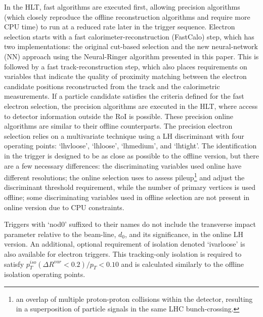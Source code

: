 In the HLT, fast algorithms are executed first, allowing precision algorithms (which closely reproduce the offline reconstruction algorithms and require more CPU time) to run at a reduced rate later in the trigger sequence. Electron selection starts with a fast calorimeter-reconstruction (FastCalo) step, which has two implementations: the original cut-based selection and the new neural-network (NN) approach using the Neural-Ringer algorithm presented in this paper. This is followed by a fast track-reconstruction step, which also places requirements on variables that indicate the quality of proximity matching between the electron candidate positions reconstructed from the track and the calorimetric measurements. If a particle candidate satisfies the criteria defined for the fast electron selection, the precision algorithms are executed in the HLT, where access to detector information outside the RoI is possible. These precision online algorithms are similar to their offline counterparts. 
The precision electron selection relies on a multivariate technique using a LH discriminant with four operating points: ‘lhvloose’, ‘lhloose’, ‘lhmedium’, and ‘lhtight’. The identification in the trigger is designed to be as close as possible to the offline version, but there are a few necessary differences: the discriminating variables used online have different resolutions; the online selection uses \avgmu{} to assess pileup\footnote{an overlap of multiple proton-proton collisions within the detector, resulting in a superposition of particle signals in the same LHC bunch-crossing.} and adjust the discriminant threshold requirement, while the number of primary vertices is used offline; some discriminating variables used in offline selection are not present in online version due to CPU constraints.

Triggers with ‘nod0’ suffixed to their names do not include the transverse impact parameter relative to the beam-line, $d_0$, and its significance, in the online LH version. An additional, optional requirement of isolation denoted ‘ivarloose’ is also available for electron triggers. This tracking-only isolation is required to satisfy 
$p_T^{iso}(\Delta R^{var}<0.2)/p_T < 0.10$ and is calculated similarly to the offline isolation operating points.
